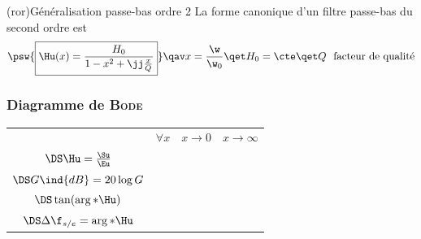 \documentclass[../../main/main.tex]{subfiles}
\begin{document}
\begin{tcb}(ror){Généralisation passe-bas ordre 2}
	La forme canonique d'un filtre passe-bas du second ordre est
	\[
		\psw{%
		\boxed{\Hu(x) = \frac{H_0}{1-x^{2} + \jj \frac{x}{Q}}}
		}%
		\qav
		x = \frac{\w}{\w_0}
		\qet
		H_0 = \cte
		\qet
		Q \text{~ facteur de qualité}
	\]
	\vspace{-15pt}
\end{tcb}

\subsubsection{Diagramme de \textsc{Bode}}
\noindent
\begin{minipage}{\linewidth}
	\centering
	\begin{tabularx}{\linewidth}{cYYY}
		\toprule
		 &
		$\forall x$
		 &
		$x\to 0$
		 &
		$x\to\infty$
		\\
		\addlinespace[0.5em]
		\cmidrule(lr){2-4}
		$\DS\Hu = \frac{\Su}{\Eu}$
		 &
		 &
		 &
		\\
		\addlinespace[0.5em]
		$\DS G\ind{dB} = 20 \log G$
		 &
		 &
		 &
		\\
		\addlinespace[0.5em]
		$\DS\tan(\arg*{\Hu})$
		 &
		 &
		 &
		\\
		\addlinespace[0.5em]
		$\DS\Delta\f_{s/e} = \arg*{\Hu}$
		 &
		\psw{$---$}
		 &
		 &
		\psw{$\DS -\pi$}
		\\
		\bottomrule
	\end{tabularx}
	\label{tab:rlc}
\end{minipage}
\end{document}
